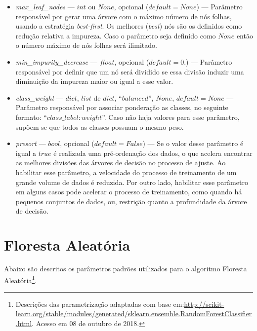 \documentclass[
	12pt,				%
	oneside,			%
	a4paper,			%
	english,			%
	brazil				%
	]{abntex2ppgsi}
\begin{document}
{{{\begin{apendicesenv}
\begin{itemize}
\item \textit{max\_leaf\_nodes} --- $int$ ou $None$, opcional ($default=None$) --- Parâmetro responsável por gerar uma árvore com o máximo número de nós folhas, usando a estratégia \textit{best-first}.
Os melhores (\textit{best}) nós são os definidos como redução relativa a impureza. Caso o parâmetro seja definido como $None$ então o número máximo de nós folhas será ilimitado. 
\item \textit{min\_impurity\_decrease} --- $float$, opcional ($default=0.$) --- Parâmetro responsável por definir que um nó será dividido se essa divisão induzir uma diminuição da impureza maior ou igual a esse valor.
\item \textit{class\_weight} --- $dict$, $list$ de $dict$, ``$balanced$'', $None$, $default=None$ --- Parâmetro responsável por associar ponderação as classes, no seguinte formato: ``${class\_label: weight}$''. Caso não haja valores para esse parâmetro, supõem-se que todos as classes possuam o mesmo peso. 
\item \textit{presort} --- $bool$, opcional ($default=False$) --- Se o valor desse parâmetro é igual a $true$ é realizada uma pré-ordenação dos dados, o que acelera encontrar as melhores divisões das árvores de decisão no processo de ajuste. Ao habilitar esse parâmetro, a velocidade do processo de treinamento de um grande volume de dados  é reduzida. Por outro lado, habilitar esse parâmetro em alguns casos pode acelerar o processo de treinamento, como quando há pequenos conjuntos de dados, ou, restrição quanto a profundidade da árvore de decisão.
\end{itemize}

\section{Floresta Aleatória}

Abaixo são descritos os parâmetros padrões utilizados para o algoritmo Floresta Aleatória\footnote{Descrições das parametrização adaptadas com base em:\url{http://scikit-learn.org/stable/modules/generated/sklearn.ensemble.RandomForestClassifier.html}. Acesso em 08 de outubro de 2018.}.


\end{apendicesenv}}}}
\end{document}
